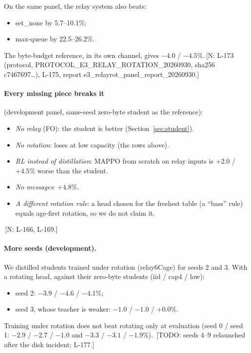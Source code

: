 \documentclass[11pt]{article}
\theoremstyle{definition}
\newif\ifshownotes\shownotestrue
\newcommand{\NOTE}[1]{\ifshownotes{\color{notecol}\,\textsf{\footnotesize[N: #1]}}\fi}
\newcommand{\TODO}[1]{\ifshownotes{\color{todocol}\,\textsf{\footnotesize[TODO: #1]}}\fi}
\begin{document}
On the same panel, the relay system also beats:
\begin{itemize}
\item set\_none by 5.7--10.1\%;
\item max-queue by 22.5--26.2\%.
\end{itemize}
The byte-budget reference, in its own channel, gives $-4.0$ / $-4.5\%$.\NOTE{L-173 (protocol,
PROTOCOL\_E3\_RELAY\_ROTATION\_20260930, sha256 c7467697\dots), L-175, report e3\_relayrot\_panel\_report\_20260930.}
\paragraph{Every missing piece breaks it} (development panel, same-seed zero-byte student as the reference):
\begin{itemize}
\item \emph{No relay} (FO): the student is better (Section~\ref{sec:student}).
\item \emph{No rotation}: loses at low capacity (the rows above).
\item \emph{RL instead of distillation}: MAPPO from scratch on relay inputs is $+2.0$ / $+4.5\%$ worse than the student.
\item \emph{No messages}: $+4.8\%$.
\item \emph{A different rotation rule}: a head chosen for the freshest table (a ``bass'' rule) equals age-first rotation,
so we do not claim it.
\end{itemize}
\NOTE{L-166, L-169.}
\paragraph{More seeds (development).} We distilled students trained under rotation (relay6Cage) for seeds 2 and 3. With
a rotating head, against their zero-byte students (iid / cap4 / low):
\begin{itemize}
\item seed 2: $-3.9$ / $-4.6$ / $-4.1\%$;
\item seed 3, whose teacher is weaker: $-1.0$ / $-1.0$ / $+0.0\%$.
\end{itemize}
Training under rotation does not beat rotating only at evaluation (seed 0 / seed 1: $-2.9$ / $-2.7$ / $-1.0$ and $-3.3$ /
$-3.1$ / $-1.9\%$). \TODO{seeds 4--9 relaunched after the disk incident; L-177.}
\end{document}
